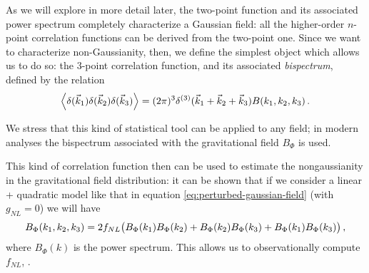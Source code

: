 \documentclass[main.tex]{subfiles}
\begin{document}
As we will explore in more detail later, the two-point function and its associated power spectrum completely characterize a Gaussian field: all the higher-order \(n\)-point correlation functions can be derived from the two-point one.
Since we want to characterize non-Gaussianity, then, we define the simplest object which allows us to do so: the 3-point correlation function, and its associated \emph{bispectrum}, defined by the relation 
%
\begin{align}
\expval{ \delta (\vec{k}_1 ) \delta (\vec{k}_2 ) \delta (\vec{k}_3 ) }
= (2 \pi )^3 \delta^{(3)} (\vec{k}_1 + \vec{k}_2 + \vec{k}_3 ) B (k_1, k_2, k_3)
\,.
\end{align}

We stress that this kind of statistical tool can be applied to any field; in modern analyses the bispectrum associated with the gravitational field \cite[eq.\ 2]{celoriaPrimordialNonGaussianity2018} \(B_\Phi \) is used.

This kind of correlation function then can be used to estimate the nongaussianity in the gravitational field distribution: it can be shown that if we consider a linear + quadratic model like that in equation \eqref{eq:perturbed-gaussian-field} (with \(g_{NL} = 0\)) we will have 
%
\begin{align}
B_{\Phi } (k_1, k_2, k_3 ) = 2 f_{NL}
\qty(B_\Phi (k_1 ) B_\Phi (k_2 ) + B_\Phi (k_2 ) B_\Phi (k_3) + B_\Phi (k_1 ) B_\Phi (k_3 ))
\,,
\end{align}
%
where \(B_\Phi (k)\) is the power spectrum. 
This allows us to observationally compute \(f_{NL}\),  \cite[]{planckcollaborationPlanck2018Results2020}. 

%




\end{document}

